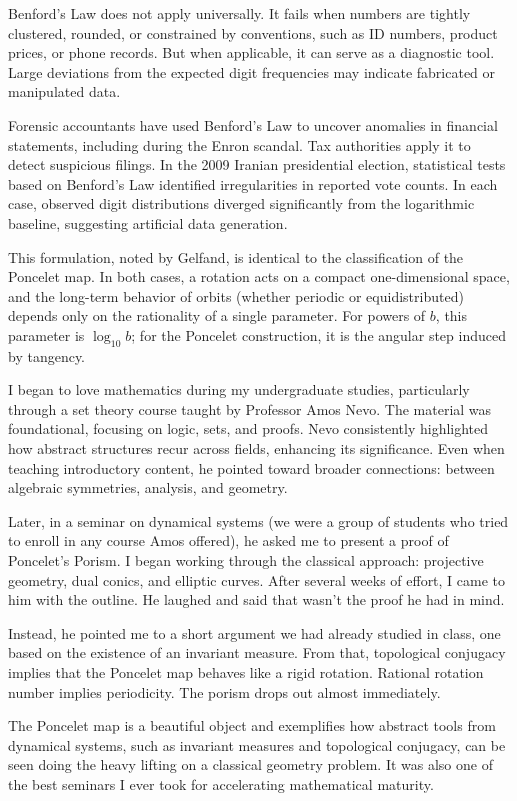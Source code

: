 Benford’s Law does not apply universally. It fails when numbers are tightly clustered, rounded, or constrained by conventions, such as ID numbers, product prices, or phone records. But when applicable, it can serve as a diagnostic tool. Large deviations from the expected digit frequencies may indicate fabricated or manipulated data.

Forensic accountants have used Benford's Law to uncover anomalies in financial statements, including during the Enron scandal. Tax authorities apply it to detect suspicious filings. In the 2009 Iranian presidential election, statistical tests based on Benford’s Law identified irregularities in reported vote counts. In each case, observed digit distributions diverged significantly from the logarithmic baseline, suggesting artificial data generation.

This formulation, noted by Gelfand, is identical to the classification of the Poncelet map. In both cases, a rotation acts on a compact one-dimensional space, and the long-term behavior of orbits (whether periodic or equidistributed) depends only on the rationality of a single parameter. For powers of $b$, this parameter is $\log_{10} b$; for the Poncelet construction, it is the angular step induced by tangency. 

\begin{commentary}
I began to love mathematics during my undergraduate studies, particularly through a set theory course taught by Professor Amos Nevo. The material was foundational, focusing on logic, sets, and proofs. Nevo consistently highlighted how abstract structures recur across fields, enhancing its significance. Even when teaching introductory content, he pointed toward broader connections: between algebraic symmetries, analysis, and geometry.

Later, in a seminar on dynamical systems (we were a group of students who tried to enroll in any course Amos offered), he asked me to present a proof of Poncelet’s Porism. I began working through the classical approach: projective geometry, dual conics, and elliptic curves. After several weeks of effort, I came to him with the outline. He laughed and said that wasn’t the proof he had in mind.

Instead, he pointed me to a short argument we had already studied in class, one based on the existence of an invariant measure. From that, topological conjugacy implies that the Poncelet map behaves like a rigid rotation. Rational rotation number implies periodicity. The porism drops out almost immediately.

The Poncelet map is a beautiful object and exemplifies how abstract tools from dynamical systems, such as invariant measures and topological conjugacy, can be seen doing the heavy lifting on a classical geometry problem. It was also one of the best seminars I ever took for accelerating mathematical maturity.
\end{commentary}

